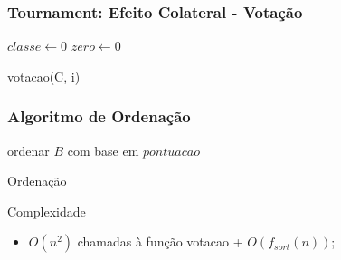 \begin{frame}
    \frametitle{Tournament: Efeito Colateral - Votação}

    \begin{function}[H]
        $classe \gets 0$\;
        $zero \gets 0$\;




        \caption{votacao(C, i)}
    \end{function}
\end{frame}

\begin{frame}
    \frametitle{Algoritmo de Ordenação}

    \begin{algorithm}[H]

        ordenar $B$ com base em $pontuacao$

        \caption{Ordenação}
    \end{algorithm}

    \begin{block}{Complexidade}
        \begin{itemize}
            \item $O(n^2)$ chamadas à função votacao + $O(f_{sort}(n))$;
        \end{itemize}
    \end{block}
\end{frame}